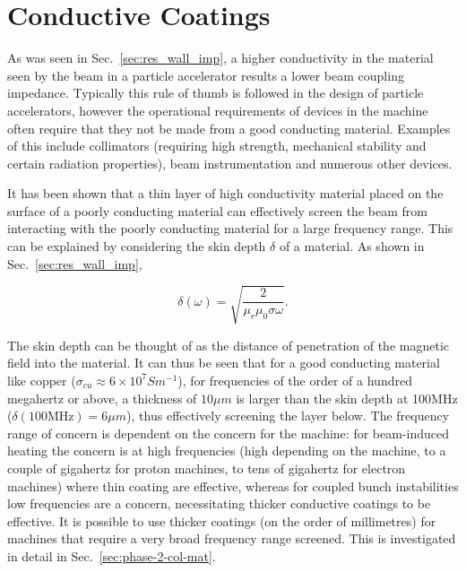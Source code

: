 \section{Conductive Coatings}
\label{sec:conductive_coatings}

As was seen in Sec.~\ref{sec:res_wall_imp}, a higher conductivity in the material seen by the beam in a particle accelerator results a lower beam coupling impedance. Typically this rule of thumb is followed in the design of particle accelerators, however the operational requirements of devices in the machine often require that they not be made from a good conducting material. Examples of this include collimators (requiring high strength, mechanical stability and certain radiation properties),  beam instrumentation and numerous other devices.

It has been shown \cite{Caspers:ThinCondLayers} that a thin layer of high conductivity material placed on the surface of a poorly conducting material can effectively screen the beam from interacting with the poorly conducting material for a large frequency range. This can be explained by considering the skin depth $\delta$ of a material. As shown in Sec.~\ref{sec:res_wall_imp}, 

\begin{equation}
\delta \left( \omega \right) = \sqrt{\frac{2}{\mu_{r}\mu_{0} \sigma \omega}}.
\end{equation}

The skin depth can be thought of as the distance of penetration of the magnetic field into the material. It can thus be seen that for a good conducting material like copper ($\sigma_{cu} \approx 6 \times 10^{7} S m^{-1}$), for frequencies of the order of a hundred megahertz or above, a thickness of $10\mu m$ is larger than the skin depth at 100MHz ($\delta \left( 100\text{MHz} \right) = 6\mu m$), thus effectively screening the layer below. The frequency range of concern is dependent on the concern for the machine: for beam-induced heating the concern is at high frequencies (high depending on the machine, to a couple of gigahertz for proton machines, to tens of gigahertz for electron machines) where thin coating are effective, whereas for coupled bunch instabilities low frequencies are a concern, necessitating thicker conductive coatings to be effective. It is possible to use thicker coatings (on the order of millimetres) for machines that require a very broad frequency range screened. This is investigated in detail in Sec.~\ref{sec:phase-2-col-mat}.

